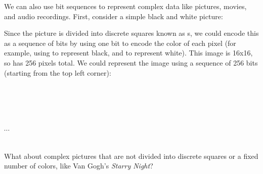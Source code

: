 We can also use bit sequences to represent complex data like pictures, movies, and audio recordings.  First, consider a simple black and white picture:

\begin{center}
{} 
\end{center}


Since the picture is divided into discrete squares known as s, we could encode this as a sequence of bits by using one bit to encode the color of each pixel (for example, using  to represent black, and  to represent white).  This image is 16x16, so has 256 pixels total.  We could represent the image using a sequence of 256 bits (starting from the top left corner):

\begin{center}
\begin{minipage}[t]{0.8\textwidth}\centering
{} \\
 \\
 \\
 \\
$\cdots$\\
 \\
\end{minipage}
\end{center}
What about complex pictures that are not divided into discrete squares or a fixed number of colors, like Van Gogh's {\em Starry Night}?
\begin{center}
{} 
\end{center}

